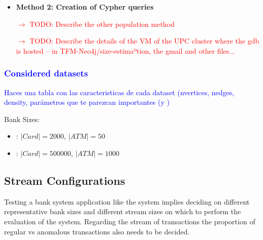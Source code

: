 \begin{itemize}

\begin{comment}
- Interesting reference for coordinates and distances in cypher - https://lyonwj.com/blog/spatial-cypher-cheat-sheet 
- Transactions dataset Generation  - a transaction dataset simulator → useful with the description of fraud scenarios, that can be generated among the transactions dataset, also with customers and terminals info generation (similar to ATMs concept) 
\end{comment}

\item {\textbf{Method 2: Creation of Cypher queries\\}}

\textcolor{red}{$\rightarrow$ TODO: Describe the other population method}

\textcolor{red}{$\rightarrow$ TODO: Describe the details of the VM of the UPC cluster where the gdb is hosted -- in TFM-Neo4j/size-estimaºtion, the gmail and other files...}

\end{itemize}


\textcolor{blue}{
\subsubsection{Considered datasets}
Haces una tabla con las caracteristicas de cada dataset (nvertices, nedges, density, par\'ametros  que te parezcan importantes (\smallG y \mediumG)
}

Bank Sizes:
\begin{itemize}
    \item \smallG: $|Card| = 2000$, $|ATM| = 50$
    \item \mediumG: $|Card| = 500000$,  $|ATM| = 1000$
\end{itemize}
\subsection{Stream Configurations}\label{exps:bank-stream-configs}

Testing a bank system application like the \DPATM system implies deciding on different representative bank sizes and different stream sizes on which to perform the evaluation of the system. Regarding the stream of transactions the proportion of regular vs anomalous transactions also needs to be decided.\\

